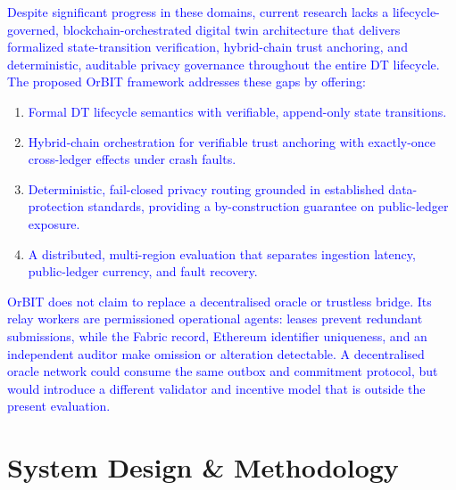 \documentclass[final,5p,times,twocolumn]{elsarticle}
\begin{document}
\textcolor{blue}{Despite significant progress in these domains, current research lacks a lifecycle-governed,
blockchain-orchestrated digital twin architecture that delivers formalized state-transition
verification, hybrid-chain trust anchoring, and deterministic, auditable privacy governance
throughout the entire DT lifecycle. The proposed OrBIT framework addresses these gaps by
offering:}
\begin{enumerate}
    \item \textcolor{blue}{Formal DT lifecycle semantics with verifiable, append-only state transitions.}
    \item \textcolor{blue}{Hybrid-chain orchestration for verifiable trust anchoring with exactly-once cross-ledger effects under crash faults.}
    \item \textcolor{blue}{Deterministic, fail-closed privacy routing grounded in established data-protection standards, providing a by-construction guarantee on public-ledger exposure.}
    \item \textcolor{blue}{A distributed, multi-region evaluation that separates ingestion latency, public-ledger currency, and fault recovery.}
\end{enumerate}
\textcolor{blue}{OrBIT does not claim to replace a decentralised oracle or trustless bridge. Its relay workers are permissioned operational agents: leases prevent redundant submissions, while the Fabric record, Ethereum identifier uniqueness, and an independent auditor make omission or alteration detectable. A decentralised oracle network could consume the same outbox and commitment protocol, but would introduce a different validator and incentive model that is outside the present evaluation.}


%

\section{\textbf{System Design \& Methodology}}
\label{sec:system_design}
\end{document}
